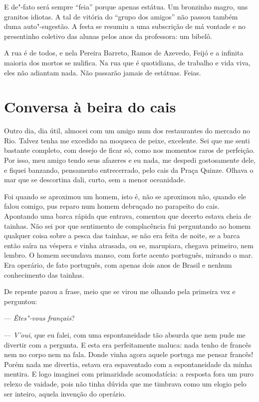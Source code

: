 E de"-fato será sempre ``feia'' porque apenas estátua. Um bronzinho magro,
uns granitos idiotas. A tal de vitória do ``grupo dos amigos'' não passou
também duma auto"-sugestão. A festa se resumiu a uma subscrição de má
vontade e no presentinho coletivo das alunas pelos anos da professora:
um bibelô.

A rua é de todos, e nela Pereira Barreto, Ramos de Azevedo, Feijó e a
infinita maioria dos mortos se nulifica. Na rua que é quotidiana, de
trabalho e vida viva, eles não adiantam nada. Não passarão jamais de
estátuas. Feias.

\chapter{Conversa à beira do cais}

Outro dia, dia útil, almocei com um amigo num dos restaurantes do
mercado no Rio. Talvez tenha me excedido na moqueca de peixe, excelente.
Sei que me senti bastante completo, com desejo de ficar só, como nos
momentos raros de perfeição. Por isso, meu amigo tendo seus afazeres e
eu nada, me despedi gostosamente dele, e fiquei banzando, pensamento
entrecerrado, pelo cais da Praça Quinze. Olhava o mar que se descortina
dali, curto, sem a menor oceanidade.

Foi quando se aproximou um homem, isto é, não se aproximou não, quando
ele falou comigo, pus reparo num homem debruçado no parapeito do cais.
Apontando uma barca rápida que entrava, comentou que decerto estava
cheia de tainhas. Não sei por que sentimento de complacência fui
perguntando ao homem qualquer coisa sobre a pesca das tainhas, se não
era feita de noite, se a barca então saíra na véspera e vinha atrasada,
ou se, marupiara, chegava primeiro, nem lembro. O homem secundava manso,
com forte acento português, mirando o mar. Era operário, de fato
português, com apenas dois anos de Brasil e nenhum conhecimento das
tainhas.

De repente parou a frase, meio que se virou me olhando pela primeira vez
e perguntou:

--- \emph{Êtes"-vous français}?

--- \emph{V'oui}, que eu falei, com uma espontaneidade tão absurda que
nem pude me divertir com a pergunta. E esta era perfeitamente maluca:
nada tenho de francês nem no corpo nem na fala. Donde vinha agora aquele
portuga me pensar francês! Porém nada me divertia, estava era
espaventado com a espontaneidade da minha mentira. E logo imaginei com
primaridade acomodatícia: a resposta fora um puro relexo de vaidade,
pois não tinha dúvida que me timbrava como um elogio pelo ser inteiro,
aquela invenção do operário.

